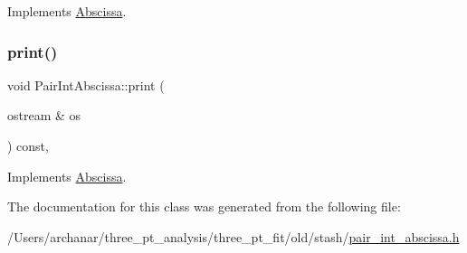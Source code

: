 Implements \mbox{\hyperlink{classAbscissa_a98e122d32d82979bd30338abc15768fd}{Abscissa}}.

\mbox{\label{classPairIntAbscissa_aab7471f83b36cb5a16212902a30d8ce2}} 
\subsubsection{\texorpdfstring{print()}{print()}\hspace{0.1cm}{\footnotesize\ttfamily [2/2]}}
{\footnotesize\ttfamily void Pair\+Int\+Abscissa\+::print (\begin{DoxyParamCaption}\item[{ostream \&}]{os }\end{DoxyParamCaption}) const\hspace{0.3cm}{\ttfamily [inline]}, {\ttfamily [virtual]}}



Implements \mbox{\hyperlink{classAbscissa_a98e122d32d82979bd30338abc15768fd}{Abscissa}}.



The documentation for this class was generated from the following file\+:\begin{DoxyCompactItemize}
\item 
/\+Users/archanar/three\+\_\+pt\+\_\+analysis/three\+\_\+pt\+\_\+fit/old/stash/\mbox{\hyperlink{old_2stash_2pair__int__abscissa_8h}{pair\+\_\+int\+\_\+abscissa.\+h}}\end{DoxyCompactItemize}
